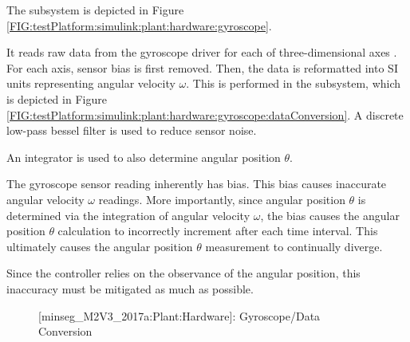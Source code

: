 \documentclass[crop=false,float=true,class=scrreprt]{standalone}
\begin{document}
\label{SEC:testPlatform:simulink:plant:hardware:motorDriver}

The  subsystem is depicted in Figure~%
\ref{FIG:testPlatform:simulink:plant:hardware:gyroscope}.

It reads raw data from the gyroscope driver for each of three-dimensional axes
{\fns[\tif{x, y, z}]}.
For each axis, sensor bias is first removed.
Then, the data is reformatted into SI units representing angular velocity $\omega$.
This is performed in the  subsystem,
which is depicted in Figure~%
\ref{FIG:testPlatform:simulink:plant:hardware:gyroscope:dataConversion}.
A discrete low-pass bessel filter is used to reduce sensor noise.
{}

An integrator is used to also determine angular position $\theta$.




\label{SEC:testPlatform:simulink:plant:hardware:gyroscope:bias}

The gyroscope sensor reading inherently has bias.
This bias causes inaccurate angular velocity $\omega$ readings.
More importantly, since angular position $\theta$ is determined 
via the integration of angular velocity $\omega$,
the bias causes the angular position $\theta$ calculation to incorrectly increment
after each time interval.
This ultimately causes the angular position $\theta$ measurement
to continually diverge.

Since the controller relies on the observance of the angular position,
this inaccuracy must be mitigated as much as possible.




\vspace*{\fill}
\begin{figure}[H]%
\centering%
%
\caption[{[minseg\_M2V3\_2017a:Plant:Hardware]: Gyroscope/Data Conversion}]%
        {{[minseg\_M2V3\_2017a:Plant:Hardware]: Gyroscope/Data Conversion%
          \label{SEC:testPlatform:simulink:plant:hardware:gyroscope:dataConversion}%
        }}%
\end{figure}
\vspace*{\fill}




\clearpage
\end{document}
